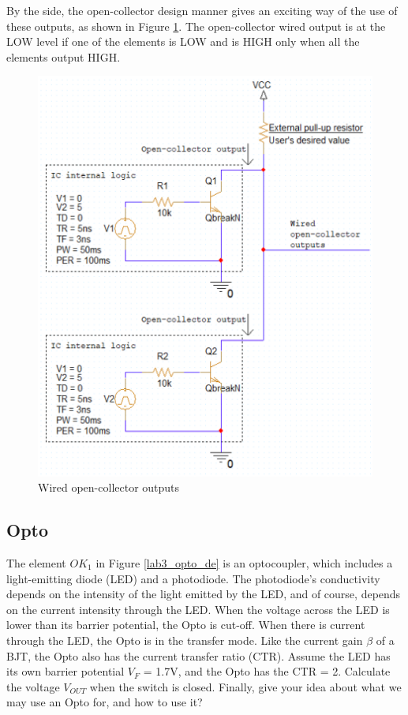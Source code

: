 By the side, the open-collector design manner gives an exciting way of the use of these outputs, as shown in Figure \ref{lab3_wiredOC}. The open-collector wired output is at the LOW level if one of the elements is LOW and is HIGH only when all the elements output HIGH.

\begin{figure}[H]
    \centering
    \includegraphics[width=15cm]{source/picture/bai_3/lab3_wiredOC.png}
    \caption{Wired open-collector outputs}
    \label{lab3_wiredOC}
\end{figure}

\subsection{Opto}

The element $OK_1$ in Figure \ref{lab3_opto_de} is an optocoupler, which includes a light-emitting diode (LED) and a photodiode. The photodiode's conductivity depends on the intensity of the light emitted by the LED, and of course, depends on the current intensity through the LED. When the voltage across the LED is lower than its barrier potential, the Opto is cut-off. When there is current through the LED, the Opto is in the transfer mode. Like the current gain $\beta$ of a BJT, the Opto also has the current transfer ratio (CTR). Assume the LED has its own barrier potential $V_F$ = 1.7V, and the Opto has the CTR = 2. Calculate the voltage $V_{OUT}$ when the switch is closed. Finally, give your idea about what we may use an Opto for, and how to use it? 


